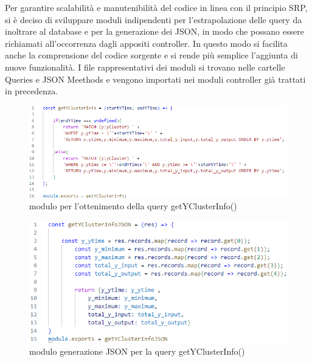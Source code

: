 Per garantire scalabilità e manutenibilità del codice in linea con il principio SRP, si è deciso di sviluppare moduli indipendenti per l'estrapolazione delle query da inoltrare al database e per la generazione dei JSON, in modo che possano essere richiamati all'occorrenza dagli appositi controller.
In questo modo si facilita anche la comprensione del codice sorgente e si rende più semplice l'aggiunta di nuove funzionalità.
I file rappresentativi dei moduli si trovano nelle cartelle Queries e JSON Meethods e vengono importati nei moduli controller già trattati in precedenza.

\begin{figure}[H]
    \centering \includegraphics[keepaspectratio=true,scale=0.7]{Images/esempioModuliQuery.png}
    \caption{modulo per l'ottenimento della query getYClusterInfo()}
\end{figure}

\begin{figure}[H]
    \centering \includegraphics[keepaspectratio=true,scale=0.7]{Images/esempioModuliCreazioneJSON.png}
    \caption{modulo generazione JSON per la query getYClusterInfo()}
\end{figure}
\thispagestyle{mystyle}

